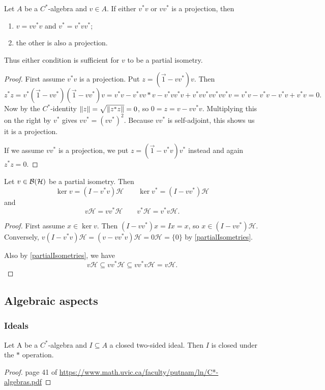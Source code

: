\begin{lemma} \label{partialIsometries}
Let $A$ be a $C^*$-algebra and $v\in A$.
If either $v^*v$ or $vv^*$ is a projection, then
\begin{enumerate}
\item $v=vv^*v$ and $v^* = v^*vv^*$;
\item the other is also a projection.
\end{enumerate}
Thus either condition is sufficient for $v$ to be a partial isometry.
\end{lemma}
\begin{proof}
First assume $v^*v$ is a projection. Put $z = (\vec{1}- vv^*)v$. Then
\[ z^*z = v^*(\vec{1}-vv^*)(\vec{1}-vv^*)v = v^*v - v^*vv*v -v^*vv^*v + v^*vv^*vv^*vv^*v = v^*v - v^*v - v^*v + v^*v = 0. \]
Now by the $C^*$-identity $\lVert z\rVert = \sqrt{\lVert z^*z\rVert} = 0$, so $0=z= v - vv^*v$. Multiplying this on the right by $v^*$ gives $vv^* = (vv^*)^2$. Because $vv^*$ is self-adjoint, this shows us it is a projection.

If we assume $vv^*$ is a projection, we put $z = (\vec{1}- v^*v)v^*$ instead and again $z^*z = 0$.
\end{proof}

\begin{lemma}
Let $v\in\operatorname{\mathcal{B}}(\mathcal{H})$ be a partial isometry. Then
\[\ker v = (I - v^*v)\mathcal{H} \qquad \ker v^* = (I - vv^*)\mathcal{H}\]
and
\[ v\mathcal{H} = vv^*\mathcal{H} \qquad v^*\mathcal{H} = v^*v\mathcal{H}. \]
\end{lemma}
\begin{proof}
First assume $x\in\ker v$. Then $(I-vv^*)x = Ix = x$, so $x\in (I - vv^*)\mathcal{H}$. Conversely, $v(I-v^*v)\mathcal{H} = (v-vv^*v)\mathcal{H} = 0\mathcal{H} = \{0\}$ by \ref{partialIsometries}.

Also by \ref{partialIsometries}, we have
\[ v\mathcal{H} \subseteq vv^*\mathcal{H} \subseteq vv^*v\mathcal{H} = v\mathcal{H}. \]
\end{proof}

\subsection{Algebraic aspects}
\subsubsection{Ideals}

\begin{proposition} \label{closedIdealIsStarIdeal}
Let A be a $C^*$-algebra and $I\subseteq A$ a closed two-sided ideal. Then $I$ is closed under the $*$ operation.
\end{proposition}
\begin{proof}
page 41 of \url{https://www.math.uvic.ca/faculty/putnam/ln/C*-algebras.pdf}
\end{proof}

